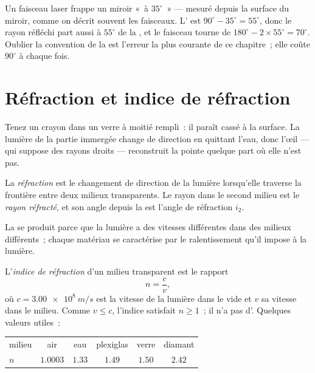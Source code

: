 \begin{example}\label{ex:g10:refraction:mirror}
Un faisceau laser frappe un miroir «~à $35^\circ$~» --- mesuré depuis la
surface du miroir, comme on décrit souvent les faisceaux. L' est $90^\circ - 35^\circ = 55^\circ$, donc le rayon
réfléchi part aussi à $55^\circ$ de la , et le faisceau
tourne de $180^\circ - 2 \times 55^\circ = 70^\circ$. Oublier la
convention de la  est l'erreur la plus courante de ce
chapitre~; elle coûte $90^\circ$ à chaque fois.
\end{example}

\section{Réfraction et indice de réfraction}

Tenez un crayon dans un verre à moitié rempli~: il paraît cassé à la
surface. La lumière de la partie immergée change de direction en
quittant l'eau, donc l'œil --- qui suppose des rayons droits ---
reconstruit la pointe quelque part où elle n'est pas.

\begin{definition}[Réfraction]\label{def:g10:refraction:refraction}
La \emph{réfraction} est le changement de direction de
la lumière lorsqu'elle traverse la frontière entre deux milieux
transparents. Le rayon dans le second milieu est le \emph{rayon
réfracté}, et son angle depuis la
 est l'angle de réfraction $i_2$.
\end{definition}

La  se produit parce que la lumière a des vitesses
différentes dans des milieux différents~; chaque matériau se
caractérise par le ralentissement qu'il impose à la lumière.

\begin{definition}\label{def:g10:refraction:index}
L'\emph{indice de réfraction} d'un milieu
transparent est le rapport
\[
n = \frac{c}{v},
\]
où $c = \qty{3.00e8}{m/s}$ est la vitesse de la lumière dans le vide et
$v$ sa vitesse dans le milieu. Comme $v \leq c$, l'indice satisfait
$n \geq 1$~; il n'a pas d'. Quelques valeurs utiles~:
\begin{center}
\begin{tabular}{lccccc}
milieu & air & eau & plexiglas & verre & diamant \\
$n$ & $1.0003$ & $1.33$ & $1.49$ & $1.50$ & $2.42$ \\
\end{tabular}
\end{center}
\end{definition}

